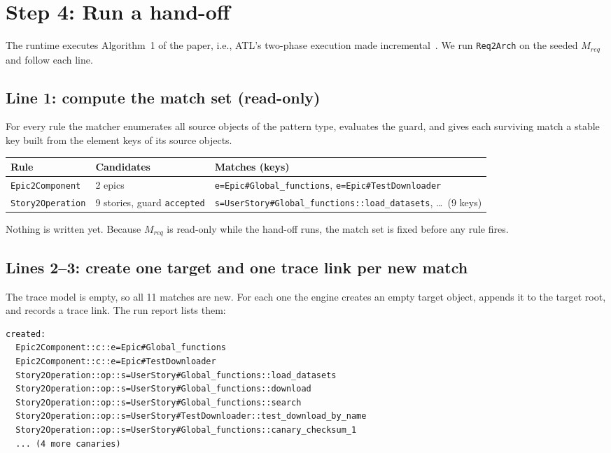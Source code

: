 \documentclass[10pt,a4paper]{article}
\newcommand{\code}[1]{\texttt{#1}}
\theoremstyle{definition}
\begin{document}
\section{Step 4: Run a hand-off}\label{sec:step4}

The runtime executes Algorithm~1 of the paper, i.e., ATL's two-phase execution
made incremental~\cite{jouault2010incremental}. We run \code{Req2Arch} on the
seeded $M_{\mathit{req}}$ and follow each line.

\subsection{Line 1: compute the match set (read-only)}

For every rule the matcher enumerates all source objects of the pattern
type, evaluates the guard, and gives each surviving match a stable key built
from the element keys of its source objects.

\begin{center}\small
\begin{tabular}{@{}l l l@{}}
\toprule
Rule & Candidates & Matches (keys) \\
\midrule
\code{Epic2Component} & 2 epics & \code{e=Epic\#Global_functions}, \code{e=Epic\#TestDownloader} \\
\code{Story2Operation} & 9 stories, guard \code{accepted} & \code{s=UserStory\#Global_functions::load_datasets}, \ldots\ (9 keys) \\
\bottomrule
\end{tabular}
\end{center}

Nothing is written yet. Because $M_{\mathit{req}}$ is read-only while the
hand-off runs, the match set is fixed before any rule fires.

\subsection{Lines 2--3: create one target and one trace link per new match}

The trace model is empty, so all 11 matches are new. For each one the engine
creates an empty target object, appends it to the target root, and records a
trace link. The run report lists them:

\begin{lstlisting}[style=engine, caption={Engine output: created targets of the first \code{Req2Arch} run.}]
created:
  Epic2Component::c::e=Epic#Global_functions
  Epic2Component::c::e=Epic#TestDownloader
  Story2Operation::op::s=UserStory#Global_functions::load_datasets
  Story2Operation::op::s=UserStory#Global_functions::download
  Story2Operation::op::s=UserStory#Global_functions::search
  Story2Operation::op::s=UserStory#TestDownloader::test_download_by_name
  Story2Operation::op::s=UserStory#Global_functions::canary_checksum_1
  ... (4 more canaries)
\end{lstlisting}
\end{document}
